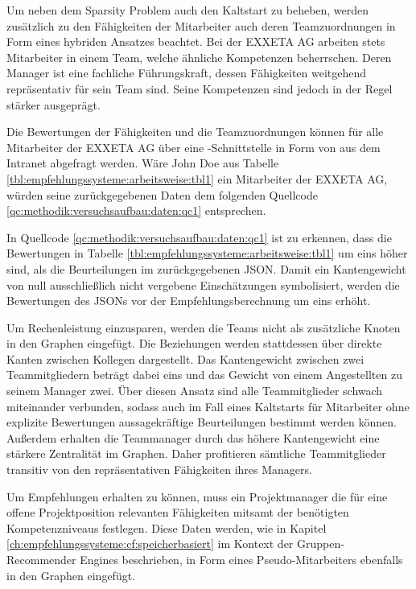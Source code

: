 Um neben dem Sparsity Problem auch den Kaltstart zu beheben, werden zusätzlich zu den Fähigkeiten der Mitarbeiter auch deren Teamzuordnungen in Form eines hybriden Ansatzes beachtet. Bei der EXXETA AG arbeiten stets Mitarbeiter in einem Team, welche ähnliche Kompetenzen beherrschen. Deren Manager ist eine fachliche Führungskraft, dessen Fähigkeiten weitgehend repräsentativ für sein Team sind. Seine Kompetenzen sind jedoch in der Regel stärker ausgeprägt.

Die Bewertungen der Fähigkeiten und die Teamzuordnungen können für alle Mitarbeiter der EXXETA AG über eine -Schnittstelle in Form von  aus dem Intranet abgefragt werden. Wäre John Doe aus Tabelle \ref{tbl:empfehlungssysteme:arbeitsweise:tbl1} ein Mitarbeiter der EXXETA AG, würden seine zurückgegebenen Daten dem folgenden Quellcode \ref{qc:methodik:versuchsaufbau:daten:qc1} entsprechen.



In Quellcode \ref{qc:methodik:versuchsaufbau:daten:qc1} ist zu erkennen, dass die Bewertungen in Tabelle \ref{tbl:empfehlungssysteme:arbeitsweise:tbl1} um eins höher sind, als die Beurteilungen im zurückgegebenen \ac{JSON}. Damit ein Kantengewicht von null ausschließlich nicht vergebene Einschätzungen symbolisiert, werden die Bewertungen des \acp{JSON} vor der Empfehlungsberechnung um eins erhöht.

Um Rechenleistung einzusparen, werden die Teams nicht als zusätzliche Knoten in den Graphen eingefügt. Die Beziehungen werden stattdessen über direkte Kanten zwischen Kollegen dargestellt. Das Kantengewicht zwischen zwei Teammitgliedern beträgt dabei eins und das Gewicht von einem Angestellten zu seinem Manager zwei. Über diesen Ansatz sind alle Teammitglieder schwach miteinander verbunden, sodass auch im Fall eines Kaltstarts für Mitarbeiter ohne explizite Bewertungen aussagekräftige Beurteilungen bestimmt werden können. Außerdem erhalten die Teammanager durch das höhere Kantengewicht eine stärkere Zentralität im Graphen.  Daher profitieren sämtliche Teammitglieder transitiv von den repräsentativen Fähigkeiten ihres Managers.

Um Empfehlungen erhalten zu können, muss ein Projektmanager die für eine offene Projektposition relevanten Fähigkeiten mitsamt der benötigten Kompetenzniveaus festlegen. Diese Daten werden, wie in Kapitel \ref{ch:empfehlungssysteme:cf:speicherbasiert} im Kontext der Gruppen-Recommender Engines beschrieben, in Form eines Pseudo-Mitarbeiters ebenfalls in den Graphen eingefügt.

